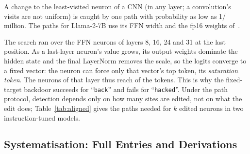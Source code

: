  A change to the least-visited neuron of a CNN (in any layer; a convolution's
visits are not uniform) is caught by one path with probability as low as 1/\CnnMinNode{} million. The \PathsLlama{} paths for Llama-2-7B use its FFN width
\WidthLlama{} and the fp16 weights of~\cite{anchuri2026verifiable}.

 The search ran over the FFN neurons of layers 8, 16, 24 and 31 at the last
position. As a last-layer neuron's value grows, its output weights dominate the hidden state and
the final LayerNorm removes the scale, so the logits converge to a fixed vector: the neuron can
force only that vector's top token, its \emph{saturation token}. The \ReachNeurons{} neurons of that layer thus reach
\ReachTokens{} of the \ReachVocab{} tokens. This is why the
fixed-target backdoor succeeds for ``\texttt{back}'' and fails for ``\texttt{hacked}''. Under the
path protocol, detection depends only on how many sites are edited, not on what the edit does;
Table~\ref{tab:aligned} gives the paths needed for $k$ edited neurons in two instruction-tuned
models.

\subsection{Systematisation: Full Entries and Derivations}
\label{ext:attack-sok}

